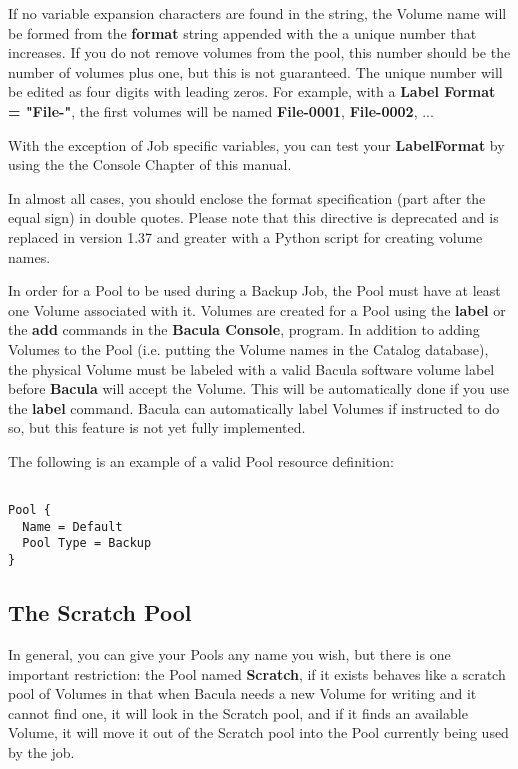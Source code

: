 \begin{description}
   If no variable expansion characters are found in the string, the Volume
   name will be formed from the {\bf format} string appended with the
   a unique number that increases.  If you do not remove volumes from the
   pool, this number should be the number of volumes plus one, but this
   is not guaranteed. The unique number will be edited as four
   digits with leading zeros.  For example, with a {\bf Label Format =
   "File-"}, the first volumes will be named {\bf File-0001}, {\bf
   File-0002}, ...

   With the exception of Job specific variables, you can test your {\bf
   LabelFormat} by using the  the Console Chapter
   of this manual.

   In almost all cases, you should enclose the format specification (part
   after the equal sign) in double quotes.  Please note that this directive
   is deprecated and is replaced in version 1.37 and greater with a Python
   script for creating volume names.

\end{description}

In order for a Pool to be used during a Backup Job, the Pool must have at
least one Volume associated with it.  Volumes are created for a Pool using
the {\bf label} or the {\bf add} commands in the {\bf Bacula Console},
program.  In addition to adding Volumes to the Pool (i.e.  putting the
Volume names in the Catalog database), the physical Volume must be labeled
with a valid Bacula software volume label before {\bf Bacula} will accept
the Volume.  This will be automatically done if you use the {\bf label}
command.  Bacula can automatically label Volumes if instructed to do so,
but this feature is not yet fully implemented.

The following is an example of a valid Pool resource definition: 

\footnotesize
\begin{verbatim}
 
Pool {
  Name = Default
  Pool Type = Backup
}
\end{verbatim}
\normalsize

\subsection{The Scratch Pool}
\label{TheScratchPool}
In general, you can give your Pools any name you wish, but there is one 
important restriction: the Pool named {\bf Scratch}, if it exists behaves 
like a scratch pool of Volumes in that when Bacula needs a new Volume for 
writing and it cannot find one, it will look in the Scratch pool, and if
it finds an available Volume, it will move it out of the Scratch pool into
the Pool currently being used by the job.


